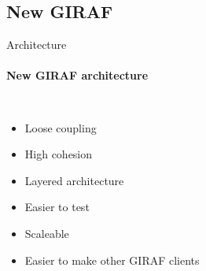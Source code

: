 \subsection{New GIRAF}
\begin{frame}{Architecture}\framesubtitle{New GIRAF architecture}
    \begin{columns}
        \hspace{-1.75em}%
        \centering
        \scalebox{0.575}{%
        }
        \begin{itemize}
            \item Loose coupling
            \item High cohesion
            \item Layered architecture
            \item Easier to test
            \item Scaleable
            \item Easier to make other GIRAF clients
        \end{itemize}
    \end{columns}
\end{frame}
